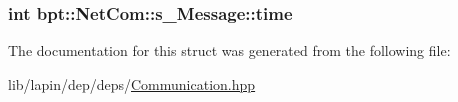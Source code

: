 \hypertarget{structbpt_1_1_net_com_1_1s___message_ad4ab6e4957dcdaaa9f37f4f66b0ad068}{
\subsubsection[{time}]{ {\bf int} bpt\-::\-Net\-Com\-::s\-\_\-\-Message\-::time}}\label{structbpt_1_1_net_com_1_1s___message_ad4ab6e4957dcdaaa9f37f4f66b0ad068}


The documentation for this struct was generated from the following file\-:\begin{DoxyCompactItemize}
\item 
lib/lapin/dep/deps/\hyperlink{_communication_8hpp}{Communication.\-hpp}\end{DoxyCompactItemize}
